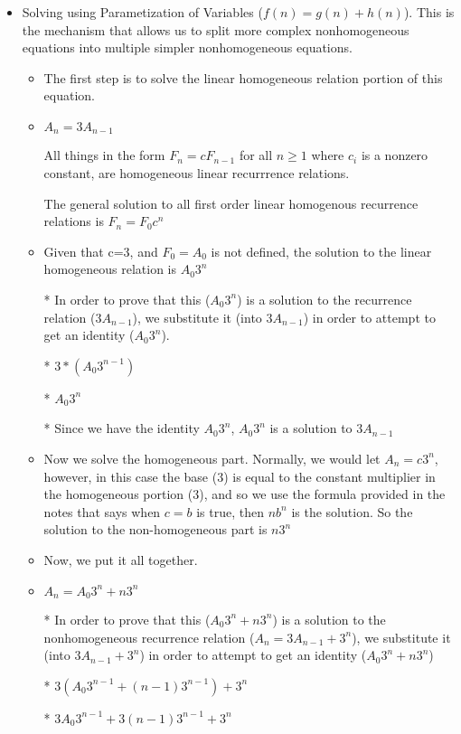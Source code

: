 \documentclass{article}
\begin{document}
\begin{enumerate}
\begin{enumerate}
\begin{itemize}
\begin{itemize}
      \end{itemize} %
    \item Solving using Parametization of Variables ($f(n)=g(n)+h(n)$). This is the mechanism that allows us to split more complex nonhomogeneous equations into multiple simpler nonhomogeneous equations.
      \begin{itemize} %
      \item The first step is to solve the linear homogeneous relation portion of this equation.
      \item $A_{n}=3A_{n-1}$
      \item [] All things in the form $F_{n}=cF_{n-1}$ for all $n\geq1$ where $c_{i}$ is a nonzero constant, are homogeneous linear recurrrence relations.
      \item [] The general solution to all first order linear homogenous recurrence relations is $F_{n}=F_{0}c^{n}$
      \item Given that c=3, and $F_{0}=A_{0}$ is not defined, the solution to the linear homogeneous relation is $A_{0}3^{n}$
      \item [*] In order to prove that this ($A_{0}3^{n}$) is a solution to the recurrence relation ($3A_{n-1}$), we substitute it (into $3A_{n-1}$) in order to attempt to get an identity ($A_{0}3^{n}$).
      \item [*] $3*(A_{0}3^{n-1})$
      \item [*] $A_{0}3^{n}$
      \item [*] Since we have the identity $A_{0}3^{n}$, $A_{0}3^{n}$ is a solution to $3A_{n-1}$
      \item Now we solve the homogeneous part. Normally, we would let $A_{n}=c3^{n}$, however, in this case the base ($3$) is equal to the constant multiplier in the homogeneous portion ($3$), and so we use the formula provided in the notes that says when $c=b$ is true, then $nb^{n}$ is the solution. So the solution to the non-homogeneous part is $n3^{n}$
      \item Now, we put it all together.
      \item $A_{n}=A_{0}3^{n} + n3^{n}$
      \item [*] In order to prove that this ($A_{0}3^{n}+n3^{n}$) is a solution to the nonhomogeneous recurrence relation ($A_{n}=3A_{n-1}+3^{n}$), we substitute it (into $3A_{n-1}+3^{n}$) in order to attempt to get an identity ($A_{0}3^{n}+n3^{n}$)
      \item [*] $3(A_{0}3^{n-1} + (n-1)3^{n-1}) + 3^{n}$
      \item [*] $3A_{0}3^{n-1} + 3(n-1)3^{n-1} + 3^{n}$

\end{itemize}
\end{itemize}
\end{enumerate}
\end{enumerate}
\end{document}
